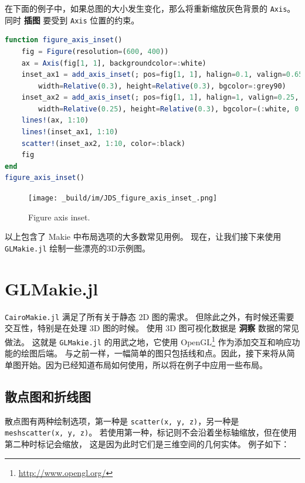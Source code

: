 \documentclass[
  notoc %
]{tufte-book}
\DeclareRobustCommand{\href}[2]{#2\footnote{\url{#1}}}
\newcommand{\passthrough}[1]{#1}
\begin{document}
在下面的例子中，如果总图的大小发生变化，那么将重新缩放灰色背景的
\passthrough{\lstinline!Axis!}。 同时 \textbf{插图} 要受到
\passthrough{\lstinline!Axis!} 位置的约束。

\begin{lstlisting}[language=Julia]
function figure_axis_inset()
    fig = Figure(resolution=(600, 400))
    ax = Axis(fig[1, 1], backgroundcolor=:white)
    inset_ax1 = add_axis_inset(; pos=fig[1, 1], halign=0.1, valign=0.65,
        width=Relative(0.3), height=Relative(0.3), bgcolor=:grey90)
    inset_ax2 = add_axis_inset(; pos=fig[1, 1], halign=1, valign=0.25,
        width=Relative(0.25), height=Relative(0.3), bgcolor=(:white, 0.65))
    lines!(ax, 1:10)
    lines!(inset_ax1, 1:10)
    scatter!(inset_ax2, 1:10, color=:black)
    fig
end
figure_axis_inset()
\end{lstlisting}

\begin{figure}
\hypertarget{fig:figure_axis_inset}{%
\centering
\texttt{[image: \_build/im/JDS\_figure\_axis\_inset\_.png]}
\caption{Figure axis inset.}\label{fig:figure_axis_inset}
}
\end{figure}

以上包含了 Makie 中布局选项的大多数常见用例。 现在，让我们接下来使用
\passthrough{\lstinline!GLMakie.jl!} 绘制一些漂亮的3D示例图。

\hypertarget{sec:glmakie}{%
\section{GLMakie.jl}\label{sec:glmakie}}

\passthrough{\lstinline!CairoMakie.jl!} 满足了所有关于静态 2D 图的需求。
但除此之外，有时候还需要交互性，特别是在处理 3D 图的时候。 使用 3D
图可视化数据是 \textbf{洞察} 数据的常见做法。 这就是
\passthrough{\lstinline!GLMakie.jl!} 的用武之地，它使用
\href{http://www.opengl.org/}{OpenGL} 作为添加交互和响应功能的绘图后端。
与之前一样，一幅简单的图只包括线和点。因此，接下来将从简单图开始。因为已经知道布局如何使用，所以将在例子中应用一些布局。

\hypertarget{ux6563ux70b9ux56feux548cux6298ux7ebfux56fe}{%
\subsection{散点图和折线图}\label{ux6563ux70b9ux56feux548cux6298ux7ebfux56fe}}

散点图有两种绘制选项，第一种是
\passthrough{\lstinline!scatter(x, y, z)!}，另一种是
\passthrough{\lstinline!meshscatter(x, y, z)!}。
若使用第一种，标记则不会沿着坐标轴缩放，但在使用第二种时标记会缩放，
这是因为此时它们是三维空间的几何实体。 例子如下：
\end{document}
